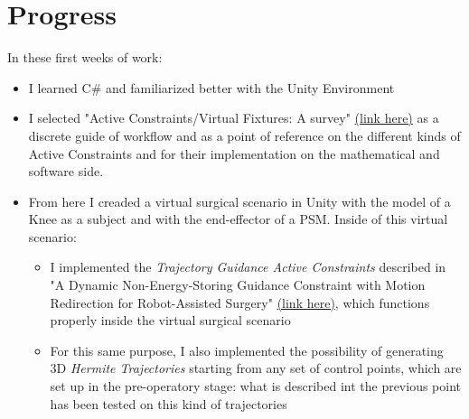 \documentclass{article}
\begin{document}
\section*{Progress}
    In these first weeks of work:
    \begin{itemize}
        \item I learned C\# and familiarized better with the Unity Environment 
        \item I selected "Active
        Constraints/Virtual Fixtures: A survey"
        \href{https://ieeexplore.ieee.org/document/6634270}{(link here)} as a
        discrete guide of workflow and as a point of reference on the different
        kinds of Active Constraints and for their implementation on the
        mathematical and software side. 
        \item From here I creaded a virtual surgical scenario in Unity with the
        model of a Knee as a subject and with the end-effector of a PSM. Inside
        of this virtual scenario: 
        \begin{itemize}
            \item I implemented the \textit{Trajectory Guidance Active
            Constraints} described in "A Dynamic Non-Energy-Storing 
            Guidance Constraint with Motion 
            Redirection for Robot-Assisted Surgery" \href{https://re.public.polimi.it/retrieve/handle/11311/1008843/167307/A%20Dynamic%20Non-Energy%20Storing%20Guidance.pdf}
            {(link here)}, which functions properly inside the virtual
            surgical scenario
            \item For this same purpose, I also implemented the possibility of
            generating 3D \textit{Hermite Trajectories} starting from any set of
            control points, which are set up in the pre-operatory stage: what is
            described int the previous point has been tested on this kind of
            trajectories
             

\end{itemize}
\end{itemize}
\end{document}
